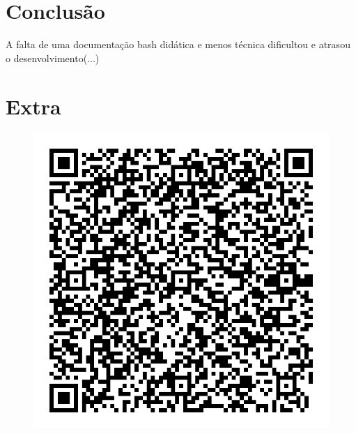 \documentclass[12pt]{article}
\begin{document}
\section{Conclusão}

A falta de uma documentação bash didática e menos técnica dificultou e atrasou o desenvolvimento(...)

\pagebreak
\section{Extra}

\begin{figure}[h]
    \centering
    \includegraphics[scale=0.3]{imagens/extra.jpg}
\end{figure}
\end{document}
